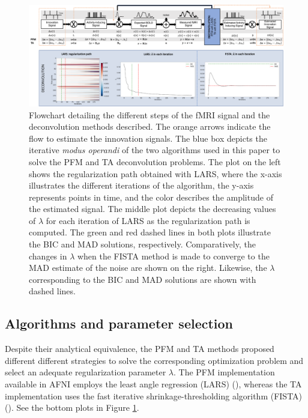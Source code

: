 \begin{figure}[t!]
    \begin{center}
        \includegraphics[width=\columnwidth]{figures/flowchart.pdf}
    \end{center}
    \caption{Flowchart detailing the different steps of the fMRI signal and the deconvolution methods described. The orange arrows indicate the flow to estimate the innovation signals. The blue box depicts the iterative \textit{modus operandi} of the two algorithms used in this paper to solve the PFM and TA deconvolution problems. The plot on the left shows the regularization path obtained with LARS, where the x-axis illustrates the different iterations of the algorithm, the y-axis represents points in time, and the color describes the amplitude of the estimated signal. The middle plot depicts the decreasing values of $\lambda$ for each iteration of LARS as the regularization path is computed. The green and red dashed lines in both plots illustrate the BIC and MAD solutions, respectively. Comparatively, the changes in $\lambda$ when the FISTA method is made to converge to the MAD estimate of the noise are shown on the right. Likewise, the $\lambda$ corresponding to the BIC and MAD solutions are shown with dashed lines.}
\label{fig:flowchart}
\end{figure}

\subsection{Algorithms and parameter selection}
\label{sec:regparam}
Despite their analytical equivalence, the PFM and TA methods proposed different different strategies to solve the corresponding optimization problem and select an adequate regularization parameter $\lambda$. The PFM implementation available in AFNI employs the least angle regression (LARS) (\citealt{Efron2004Leastangleregression}), whereas the TA implementation uses the fast iterative shrinkage-thresholding algorithm (FISTA) (\citealt{Beck2009FastIterativeShrinkage}). See the bottom plots in Figure \ref{fig:flowchart}.

